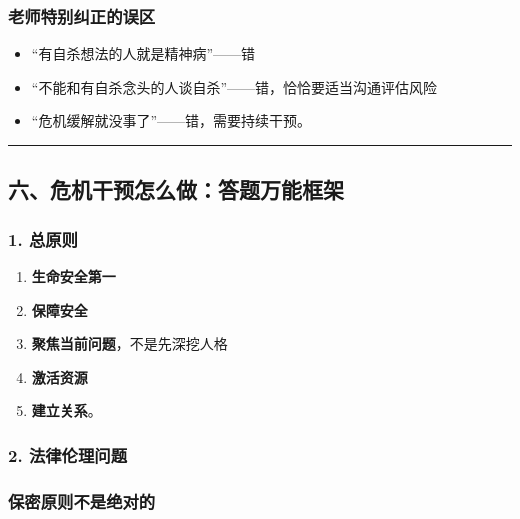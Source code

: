 \documentclass[
  a4paper,
]{ctexart}
\providecommand{\tightlist}{%
  \setlength{\itemsep}{0pt}\setlength{\parskip}{0pt}}
\begin{document}
\subsubsection{老师特别纠正的误区}\label{ux8001ux5e08ux7279ux522bux7ea0ux6b63ux7684ux8befux533a}

\begin{itemize}
\tightlist
\item
  ``有自杀想法的人就是精神病''------错
\item
  ``不能和有自杀念头的人谈自杀''------错，恰恰要适当沟通评估风险
\item
  ``危机缓解就没事了''------错，需要持续干预。
\end{itemize}

\begin{center}\rule{0.5\linewidth}{0.5pt}\end{center}

\subsection{六、危机干预怎么做：答题万能框架}\label{ux516dux5371ux673aux5e72ux9884ux600eux4e48ux505aux7b54ux9898ux4e07ux80fdux6846ux67b6}

\subsubsection{1. 总原则}\label{ux603bux539fux5219}

\begin{enumerate}
\def\labelenumi{\arabic{enumi}.}
\tightlist
\item
  \textbf{生命安全第一}
\item
  \textbf{保障安全}
\item
  \textbf{聚焦当前问题}，不是先深挖人格
\item
  \textbf{激活资源}
\item
  \textbf{建立关系}。
\end{enumerate}

\subsubsection{2.
法律伦理问题}\label{ux6cd5ux5f8bux4f26ux7406ux95eeux9898}

\subsubsection{保密原则不是绝对的}\label{ux4fddux5bc6ux539fux5219ux4e0dux662fux7eddux5bf9ux7684}
\end{document}
